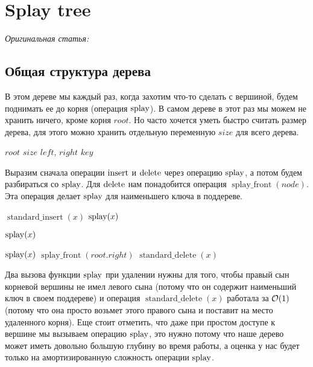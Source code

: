 \section{Splay tree} 
{\it Оригинальная статья:~\cite{tarjan1985splay}}

\subsection{Общая структура дерева}

В этом дереве мы каждый раз, когда захотим что-то сделать с вершиной, будем поднимать ее до корня (операция $\operatorname{splay}$). В самом дереве в этот раз мы можем не хранить ничего, кроме корня $root$. Но часто хочется уметь быстро считать размер дерева, для этого можно хранить отдельную переменную $size$ для всего дерева.

\begin{algorithmic}[0]
	\algrenewcommand{}
		\State $root$
		\State $size$ 
	\EndProcedure
		\State $left$, $right$
		\State $key$
	\EndProcedure
\end{algorithmic}

Выразим сначала операции $\operatorname{insert}$ и $\operatorname{delete}$ через операцию $\operatorname{splay}$, а потом будем разбираться со $\operatorname{splay}$. Для $\operatorname{delete}$ нам понадобится операция $\operatorname{splay\_front}(node)$. Эта операция делает $\operatorname{splay}$ для наименьшего ключа в поддереве.

\begin{algorithmic}[1]
		\State $\operatorname{standard\_insert}(x)$
		\State $\operatorname{splay}(x)$
	\EndProcedure

		\State $\operatorname{splay}(x)$
	\EndProcedure

		\State $\operatorname{splay}(x)$
		\State $\operatorname{splay\_front}(root.right)$
		\State $\operatorname{standard\_delete}(x)$
	\EndProcedure
\end{algorithmic}

Два вызова функции $\operatorname{splay}$ при удалении нужны для того, чтобы правый сын корневой вершины не имел левого сына (потому что он содержит наименьший ключ в своем поддереве) и операция $\operatorname{standard\_delete}(x)$ работала за $\mathcal{O}(1)$ (потому что она просто возьмет этого правого сына и поставит на место удаленного корня). Еще стоит отметить, что даже при простом доступе к вершине мы вызываем операцию $\operatorname{splay}$, это нужно потому что наше дерево может иметь довольно большую глубину во время работы, а оценка у нас будет только на амортизированную сложность операции $\operatorname{splay}$.

